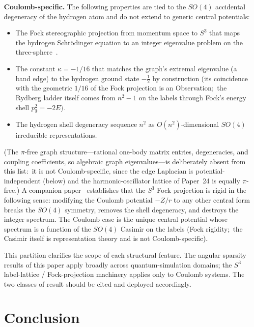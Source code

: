 \documentclass[twocolumn,pra,amsmath,amssymb,superscriptaddress]{revtex4-2}
\begin{document}
\medskip
\noindent\textbf{Coulomb-specific.}
The following properties are tied to the $SO(4)$ accidental
degeneracy of the hydrogen atom and do not extend to generic central
potentials:
\begin{itemize}
\item The Fock stereographic projection from momentum space to $S^3$
  that maps the hydrogen Schr\"odinger equation to an integer
  eigenvalue problem on the three-sphere~\cite{GeoVac_Paper7}.
\item The constant $\kappa = -1/16$ that matches the graph's extremal
  eigenvalue (a band edge) to the hydrogen ground state $-\tfrac12$ by
  construction (its coincidence with the geometric $1/16$ of the Fock
  projection is an Observation;\ the Rydberg ladder itself comes from
  $n^2 - 1$ on the labels through Fock's energy shell $p_0^2 = -2E$).
\item The hydrogen shell degeneracy sequence $n^2$ as
  $O(n^2)$-dimensional $SO(4)$ irreducible representations.
\end{itemize}
(The $\pi$-free graph structure---rational one-body matrix entries,
degeneracies, and coupling coefficients, so algebraic graph
eigenvalues---is deliberately absent from this list:\ it is not
Coulomb-specific, since the edge Laplacian is potential-independent
(below) and the harmonic-oscillator lattice of Paper~24 is equally
$\pi$-free.)
A companion paper~\cite{GeoVac_Paper23} establishes that the $S^3$
Fock projection is rigid in the following sense: modifying the
Coulomb potential $-Z/r$ to any other central form breaks the
$SO(4)$ symmetry, removes the shell degeneracy, and destroys the
integer spectrum.  The Coulomb case is the unique central potential
whose spectrum is a function of the $SO(4)$ Casimir on the labels
(Fock rigidity;\ the Casimir itself is representation theory and is
not Coulomb-specific).

\medskip
This partition clarifies the scope of each structural feature.  The
angular sparsity results of this paper apply broadly across
quantum-simulation domains; the $S^3$ label-lattice / Fock-projection
machinery applies only to Coulomb systems.  The two classes of result should
be cited and deployed accordingly.

\section{Conclusion}
\label{sec:conclusion}
\end{document}
